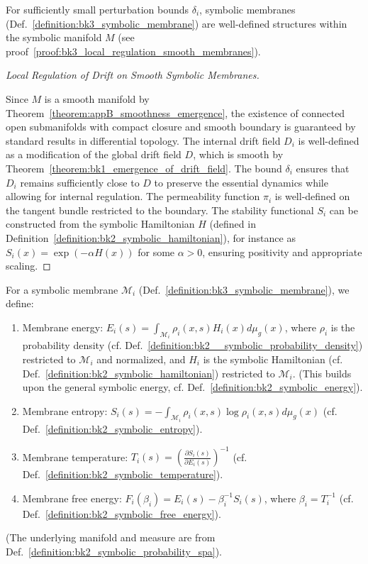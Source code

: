 \begin{lemma} \label{lemma:bk3_wellposedness_of_symbolic_membranes}
For sufficiently small perturbation bounds $\delta_i$, symbolic membranes (Def.~\ref{definition:bk3_symbolic_membrane}) are well-defined structures within the symbolic manifold $M$ (see proof~\ref{proof:bk3_local_regulation_smooth_membranes}).
\end{lemma}

\begin{proof}[Local Regulation of Drift on Smooth Symbolic Membranes]
\label{proof:bk3_local_regulation_smooth_membranes}
\leavevmode

Since $M$ is a smooth manifold by Theorem~\ref{theorem:appB_smoothness_emergence}, the existence of connected open submanifolds with compact closure and smooth boundary is guaranteed by standard results in differential topology. The internal drift field $D_i$ is well-defined as a modification of the global drift field $D$, which is smooth by Theorem~\ref{theorem:bk1_emergence_of_drift_field}. The bound $\delta_i$ ensures that $D_i$ remains sufficiently close to $D$ to preserve the essential dynamics while allowing for internal regulation. The permeability function $\pi_i$ is well-defined on the tangent bundle restricted to the boundary. The stability functional $S_i$ can be constructed from the symbolic Hamiltonian $H$ (defined in Definition~\ref{definition:bk2_symbolic_hamiltonian}), for instance as $S_i(x) = \exp(-\alpha H(x))$ for some $\alpha > 0$, ensuring positivity and appropriate scaling.
\end{proof}

\begin{definition} \label{definition:bk3_membrane_thermodynamics}
For a symbolic membrane $\mathcal{M}_i$ (Def.~\ref{definition:bk3_symbolic_membrane}), we define:
\begin{enumerate}
    \item Membrane energy: $E_i(s) = \int_{\mathcal{M}_i} \rho_i(x,s)H_i(x)d\mu_g(x)$, where $\rho_i$ is the probability density (cf. Def.~\ref{definition:bk2__symbolic_probability_density}) restricted to $\mathcal{M}_i$ and normalized, and $H_i$ is the symbolic Hamiltonian (cf. Def.~\ref{definition:bk2_symbolic_hamiltonian}) restricted to $\mathcal{M}_i$. (This builds upon the general symbolic energy, cf. Def.~\ref{definition:bk2_symbolic_energy}).
    \item Membrane entropy: $S_i(s) = -\int_{\mathcal{M}_i} \rho_i(x,s)\log\rho_i(x,s)d\mu_g(x)$ (cf. Def.~\ref{definition:bk2_symbolic_entropy}).
    \item Membrane temperature: $T_i(s) = \left(\frac{\partial S_i(s)}{\partial E_i(s)}\right)^{-1}$ (cf. Def.~\ref{definition:bk2_symbolic_temperature}).
    \item Membrane free energy: $F_i(\beta_i) = E_i(s) - \beta_i^{-1}S_i(s)$, where $\beta_i = T_i^{-1}$ (cf. Def.~\ref{definition:bk2_symbolic_free_energy}).
\end{enumerate}
(The underlying manifold and measure are from Def.~\ref{definition:bk2_symbolic_probability_spa}).
\end{definition}


